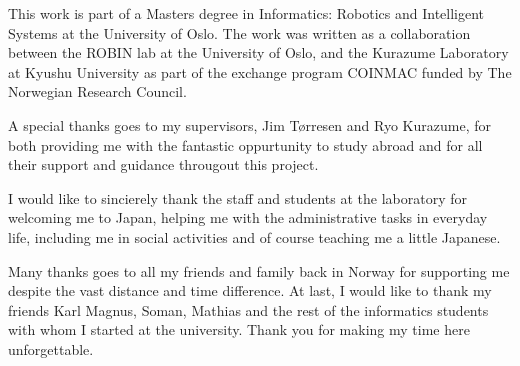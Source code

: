 This work is part of a Masters degree in Informatics: Robotics and Intelligent Systems at the University of Oslo. The work was written as a collaboration between the ROBIN lab at the University of Oslo, and the Kurazume Laboratory at Kyushu University as part of the exchange program COINMAC funded by The Norwegian Research Council.

A special thanks goes to my supervisors, Jim Tørresen and Ryo Kurazume, for both providing me with the fantastic oppurtunity to study abroad and for all their support and guidance througout this project.

I would like to sincierely thank the staff and students at the laboratory for welcoming me to Japan, helping me with the administrative tasks in everyday life, including me in social activities and of course teaching me a little Japanese.

Many thanks goes to all my friends and family back in Norway for supporting me despite the vast distance and time difference.
At last, I would like to thank my friends Karl Magnus, Soman, Mathias and the rest of the informatics students with whom I started at the university. Thank you for making my time here unforgettable. 
